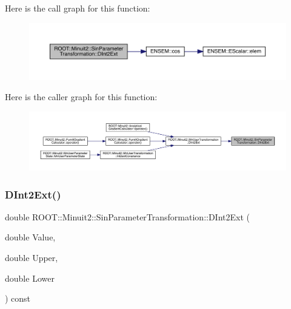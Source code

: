 Here is the call graph for this function\+:
\nopagebreak
\begin{figure}[H]
\begin{center}
\leavevmode
\includegraphics[width=350pt]{de/d62/classROOT_1_1Minuit2_1_1SinParameterTransformation_a4335749e9dd572c2234a8a119893e3fd_cgraph}
\end{center}
\end{figure}
Here is the caller graph for this function\+:
\nopagebreak
\begin{figure}[H]
\begin{center}
\leavevmode
\includegraphics[width=350pt]{de/d62/classROOT_1_1Minuit2_1_1SinParameterTransformation_a4335749e9dd572c2234a8a119893e3fd_icgraph}
\end{center}
\end{figure}
\mbox{\label{classROOT_1_1Minuit2_1_1SinParameterTransformation_a4335749e9dd572c2234a8a119893e3fd}} 
\subsubsection{\texorpdfstring{DInt2Ext()}{DInt2Ext()}\hspace{0.1cm}{\footnotesize\ttfamily [2/3]}}
{\footnotesize\ttfamily double R\+O\+O\+T\+::\+Minuit2\+::\+Sin\+Parameter\+Transformation\+::\+D\+Int2\+Ext (\begin{DoxyParamCaption}\item[{double}]{Value,  }\item[{double}]{Upper,  }\item[{double}]{Lower }\end{DoxyParamCaption}) const}


